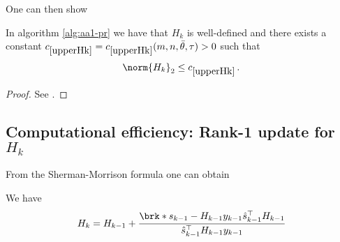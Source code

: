 %
%


One can then show
\begin{lemma}
	In algorithm \ref{alg:aa1-pr} we have that $H_k$ is well-defined and there exists a constant $\useconstant{upperHk}=\useconstant{upperHk}(m,n, \bartheta,\tau)>0$ such that
	\begin{align*}
		\norm{H_k}_2\leq \useconstant{upperHk}\,.
	\end{align*}
\end{lemma}
\begin{proof}
	See \cite[Corollary 4]{ZhaAA}.
\end{proof}



\scalebox{0.9}{

}


\subsection{Computational efficiency: Rank-1 update for $H_k$}



From the Sherman-Morrison formula one can obtain
\begin{proposition}
	We have
	\begin{align*}
		H_{k} = H_{k-1}+\frac{\brk*{s_{k-1}-H_{k-1}y_{k-1}}\hs_{k-1}^\top H_{k-1}}{\hs_{k-1}^\top H_{k-1}y_{k-1}}
	\end{align*}
\end{proposition}




